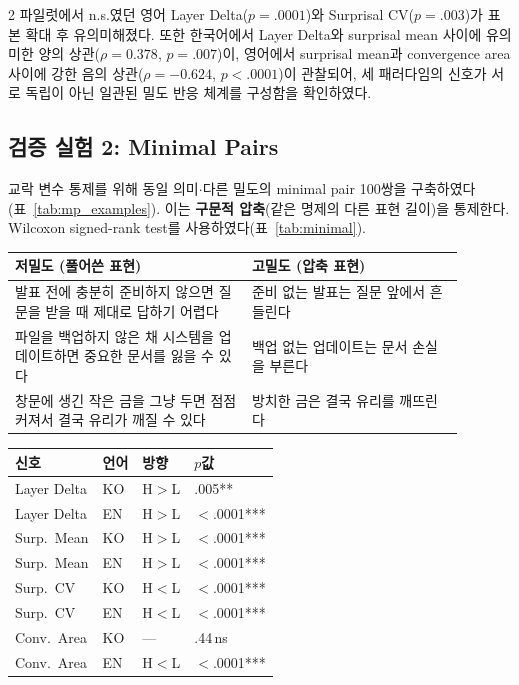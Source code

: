 \documentclass[10pt,a4paper]{article}
\begin{document}
\begin{multicols}{2}
파일럿에서 n.s.였던 영어 Layer Delta($p{=}.0001$)와 Surprisal CV($p{=}.003$)가 표본 확대 후 유의미해졌다. 또한 한국어에서 Layer Delta와 surprisal mean 사이에 유의미한 양의 상관($\rho{=}0.378$, $p{=}.007$)이, 영어에서 surprisal mean과 convergence area 사이에 강한 음의 상관($\rho{=}{-}0.624$, $p{<}.0001$)이 관찰되어, 세 패러다임의 신호가 서로 독립이 아닌 일관된 밀도 반응 체계를 구성함을 확인하였다.

\subsection{검증 실험 2: Minimal Pairs}

교락 변수 통제를 위해 동일 의미$\cdot$다른 밀도의 minimal pair 100쌍을 구축하였다(표~\ref{tab:mp_examples}). 이는 \textbf{구문적 압축}(같은 명제의 다른 표현 길이)을 통제한다. Wilcoxon signed-rank test를 사용하였다(표~\ref{tab:minimal}).

\vspace{4pt}
\begin{center}
\label{tab:mp_examples}
\footnotesize
\begin{tabular}{@{}p{0.47\linewidth}p{0.42\linewidth}@{}}
\toprule
저밀도 (풀어쓴 표현) & 고밀도 (압축 표현) \\
\midrule
발표 전에 충분히 준비하지 않으면 질문을 받을 때 제대로 답하기 어렵다 & 준비 없는 발표는 질문 앞에서 흔들린다 \\
\addlinespace
파일을 백업하지 않은 채 시스템을 업데이트하면 중요한 문서를 잃을 수 있다 & 백업 없는 업데이트는 문서 손실을 부른다 \\
\addlinespace
창문에 생긴 작은 금을 그냥 두면 점점 커져서 결국 유리가 깨질 수 있다 & 방치한 금은 결국 유리를 깨뜨린다 \\
\bottomrule
\end{tabular}
\end{center}
\vspace{4pt}

\vspace{4pt}
\begin{center}
\label{tab:minimal}
\footnotesize
\begin{tabular}{@{}llll@{}}
\toprule
신호 & 언어 & 방향 & $p$값 \\
\midrule
Layer Delta    & KO & H${>}$L & .005** \\
Layer Delta    & EN & H${>}$L & ${<}$.0001*** \\
Surp.\ Mean   & KO & H${>}$L & ${<}$.0001*** \\
Surp.\ Mean   & EN & H${>}$L & ${<}$.0001*** \\
Surp.\ CV     & KO & H${<}$L & ${<}$.0001*** \\
Surp.\ CV     & EN & H${<}$L & ${<}$.0001*** \\
Conv.\ Area   & KO & ---     & .44\,ns \\
Conv.\ Area   & EN & H${<}$L & ${<}$.0001*** \\
\bottomrule
\end{tabular}
\end{center}
\vspace{4pt}


\end{multicols}
\end{document}
